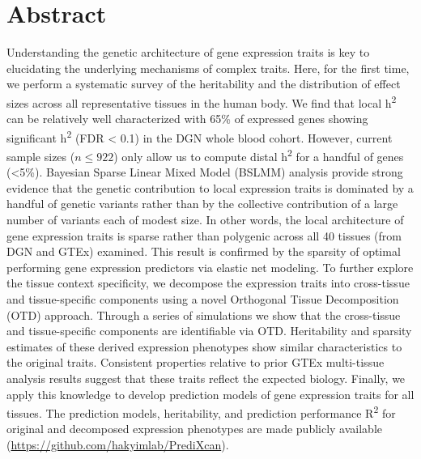 \documentclass[10pt,letterpaper]{article}
\begin{document}
\pagebreak{}

\section*{Abstract}
Understanding the genetic architecture of gene expression traits is key to elucidating the underlying mechanisms of complex traits. Here, for the first time, we perform a systematic survey of the heritability and the distribution of effect sizes across all representative tissues in the human body. We find that local h\textsuperscript{2} can be relatively well characterized with 65\% of expressed genes showing significant h\textsuperscript{2} (FDR \textless{} 0.1) in the DGN whole blood cohort. However, current sample sizes ($n\le922$) only allow us to compute distal h\textsuperscript{2} for a handful of genes (\textless{}5\%). Bayesian Sparse Linear Mixed Model (BSLMM) analysis provide strong evidence that the genetic contribution to local expression traits is dominated by a handful of genetic variants rather than by the collective contribution of a large number of variants each of modest size. In other words, the local architecture of gene expression traits is sparse rather than polygenic across all 40 tissues (from DGN and GTEx) examined. This result is confirmed by the sparsity of optimal performing gene expression predictors via elastic net modeling. To further explore the tissue context specificity, we decompose the expression traits into cross-tissue and tissue-specific components using a novel Orthogonal Tissue Decomposition (OTD) approach. Through a series of simulations we show that the cross-tissue and tissue-specific components are identifiable via OTD. Heritability and sparsity estimates of these derived expression phenotypes show similar characteristics to the original traits. Consistent properties relative to prior GTEx multi-tissue analysis results suggest that these traits reflect the expected biology. Finally, we apply this knowledge to develop prediction models of gene expression traits for all tissues. The prediction models, heritability, and prediction performance R\textsuperscript{2} for original and decomposed expression phenotypes are made publicly available (\url{https://github.com/hakyimlab/PrediXcan}).

\end{document}
